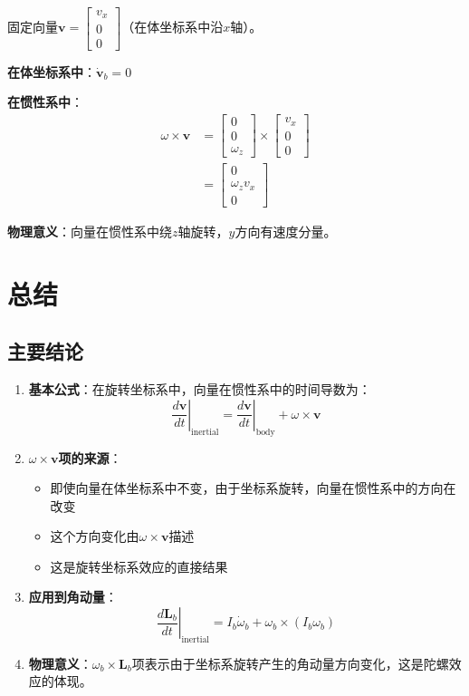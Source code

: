 \documentclass[12pt,a4paper]{article}
\begin{document}
固定向量$\bm{v} = \begin{bmatrix} v_x \\ 0 \\ 0 \end{bmatrix}$（在体坐标系中沿$x$轴）。

\textbf{在体坐标系中}：$\dot{\bm{v}}_b = 0$

\textbf{在惯性系中}：
\begin{align}
\omega \times \bm{v} &= \begin{bmatrix} 0 \\ 0 \\ \omega_z \end{bmatrix} \times \begin{bmatrix} v_x \\ 0 \\ 0 \end{bmatrix} \\
&= \begin{bmatrix} 0 \\ \omega_z v_x \\ 0 \end{bmatrix}
\end{align}

\textbf{物理意义}：向量在惯性系中绕$z$轴旋转，$y$方向有速度分量。

\section{总结}

\subsection{主要结论}

\begin{enumerate}
\item \textbf{基本公式}：在旋转坐标系中，向量在惯性系中的时间导数为：
\begin{equation}
\left.\frac{d\bm{v}}{dt}\right|_{\text{inertial}} = \left.\frac{d\bm{v}}{dt}\right|_{\text{body}} + \omega \times \bm{v}
\end{equation}

\item \textbf{$\omega \times \bm{v}$项的来源}：
\begin{itemize}
\item 即使向量在体坐标系中不变，由于坐标系旋转，向量在惯性系中的方向在改变
\item 这个方向变化由$\omega \times \bm{v}$描述
\item 这是旋转坐标系效应的直接结果
\end{itemize}

\item \textbf{应用到角动量}：
\begin{equation}
\left.\frac{d\bm{L}_b}{dt}\right|_{\text{inertial}} = I_b \dot{\omega}_b + \omega_b \times (I_b \omega_b)
\end{equation}

\item \textbf{物理意义}：$\omega_b \times \bm{L}_b$项表示由于坐标系旋转产生的角动量方向变化，这是陀螺效应的体现。
\end{enumerate}
\end{document}
